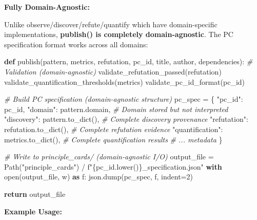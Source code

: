\documentclass[
]{article}
\newenvironment{Shaded}{}{}
\newcommand{\BuiltInTok}[1]{\textcolor[rgb]{0.00,0.50,0.00}{#1}}
\newcommand{\CommentTok}[1]{\textcolor[rgb]{0.38,0.63,0.69}{\textit{#1}}}
\newcommand{\ControlFlowTok}[1]{\textcolor[rgb]{0.00,0.44,0.13}{\textbf{#1}}}
\newcommand{\DecValTok}[1]{\textcolor[rgb]{0.25,0.63,0.44}{#1}}
\newcommand{\ImportTok}[1]{\textcolor[rgb]{0.00,0.50,0.00}{\textbf{#1}}}
\newcommand{\KeywordTok}[1]{\textcolor[rgb]{0.00,0.44,0.13}{\textbf{#1}}}
\newcommand{\NormalTok}[1]{#1}
\newcommand{\OperatorTok}[1]{\textcolor[rgb]{0.40,0.40,0.40}{#1}}
\newcommand{\SpecialCharTok}[1]{\textcolor[rgb]{0.25,0.44,0.63}{#1}}
\newcommand{\SpecialStringTok}[1]{\textcolor[rgb]{0.73,0.40,0.53}{#1}}
\newcommand{\StringTok}[1]{\textcolor[rgb]{0.25,0.44,0.63}{#1}}
\begin{document}
\textbf{Fully Domain-Agnostic:}

Unlike observe/discover/refute/quantify which have domain-specific
implementations, \textbf{publish() is completely domain-agnostic}. The
PC specification format works across all domains:

\begin{Shaded}
\begin{Highlighting}[]
\KeywordTok{def}\NormalTok{ publish(pattern, metrics, refutation, pc\_id, title, author, dependencies):}
    \CommentTok{\# Validation (domain{-}agnostic)}
\NormalTok{    validate\_refutation\_passed(refutation)}
\NormalTok{    validate\_quantification\_thresholds(metrics)}
\NormalTok{    validate\_pc\_id\_format(pc\_id)}

    \CommentTok{\# Build PC specification (domain{-}agnostic structure)}
\NormalTok{    pc\_spec }\OperatorTok{=}\NormalTok{ \{}
        \StringTok{"pc\_id"}\NormalTok{: pc\_id,}
        \StringTok{"domain"}\NormalTok{: pattern.domain,  }\CommentTok{\# Domain stored but not interpreted}
        \StringTok{"discovery"}\NormalTok{: pattern.to\_dict(),  }\CommentTok{\# Complete discovery provenance}
        \StringTok{"refutation"}\NormalTok{: refutation.to\_dict(),  }\CommentTok{\# Complete refutation evidence}
        \StringTok{"quantification"}\NormalTok{: metrics.to\_dict(),  }\CommentTok{\# Complete quantification results}
        \CommentTok{\# ... metadata}
\NormalTok{    \}}

    \CommentTok{\# Write to principle\_cards/ (domain{-}agnostic I/O)}
\NormalTok{    output\_file }\OperatorTok{=}\NormalTok{ Path(}\StringTok{"principle\_cards"}\NormalTok{) }\OperatorTok{/} \SpecialStringTok{f"}\SpecialCharTok{\{}\NormalTok{pc\_id}\SpecialCharTok{.}\NormalTok{lower()}\SpecialCharTok{\}}\SpecialStringTok{\_specification.json"}
    \ControlFlowTok{with} \BuiltInTok{open}\NormalTok{(output\_file, }\StringTok{\textquotesingle{}w\textquotesingle{}}\NormalTok{) }\ImportTok{as}\NormalTok{ f:}
\NormalTok{        json.dump(pc\_spec, f, indent}\OperatorTok{=}\DecValTok{2}\NormalTok{)}

    \ControlFlowTok{return}\NormalTok{ output\_file}
\end{Highlighting}
\end{Shaded}

\textbf{Example Usage:}
\end{document}
